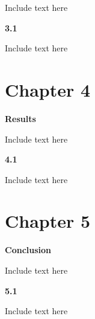 \documentclass[12pt]{article}
\begin{document}
Include text here

\vspace{1.5em}
\noindent
\textbf{3.1 }
\vspace{1.5em}

Include text here

\newpage
\section*{Chapter 4}
\begin{center}
\large \textbf{Results}
\end{center}

Include text here

\vspace{1.5em}
\noindent
\textbf{4.1 }
\vspace{1.5em}

Include text here

\newpage
\section*{Chapter 5}
\begin{center}
\large \textbf{Conclusion}
\end{center}

Include text here

\vspace{1.5em}
\noindent
\textbf{5.1 }
\vspace{1.5em}

Include text here

\clearpage
\onehalfspacing

\renewcommand{\refname}{Bibliography}
\end{document}
